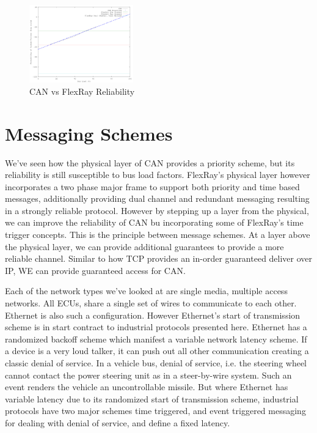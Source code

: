 \documentclass[conference,12pt]{IEEEtran}
\begin{document}
\begin{figure}
  \centering
  \includegraphics[width=0.4\textwidth]{FlexRaySystemReliability.png}
  \caption{CAN vs FlexRay Reliability}
  \label{fig:can_vs_flexray_reliability}
\end{figure}


\section{Messaging Schemes}
We've seen how the physical layer of CAN provides a priority scheme, but its
reliability is still susceptible to bus load factors. FlexRay's physical layer
however incorporates a two phase major frame to support both priority and time
based messages, additionally providing dual channel and redundant messaging
resulting in a strongly reliable protocol.  However by stepping up a layer from
the physical, we can improve the reliability of CAN bu incorporating some of
FlexRay's time trigger concepts. This is the principle between message schemes.
At a layer above the physical layer, we can provide additional guarantees to
provide a more reliable channel. Similar to how TCP provides an in-order
guaranteed deliver over IP, WE can provide guaranteed access for CAN.

Each of the network types we've looked at are single media, multiple access
networks.  All ECUs, share a single set of wires to communicate to each other.
Ethernet is also such a configuration. However Ethernet's start of transmission
scheme is in start contract to industrial protocols presented here. Ethernet has
a randomized backoff scheme which manifest a variable network latency scheme.
If a device is a very loud talker, it can push out all other communication
creating a classic denial of service. In a vehicle bus, denial of service, i.e.
the steering wheel cannot contact the power steering unit as in a steer-by-wire
system. Such an event renders the vehicle an uncontrollable missile. But where Ethernet has variable latency
due to its randomized start of transmission scheme, industrial protocols have
two major schemes time triggered, and event triggered messaging for dealing with denial of service, and define a fixed
latency. 
\end{document}
